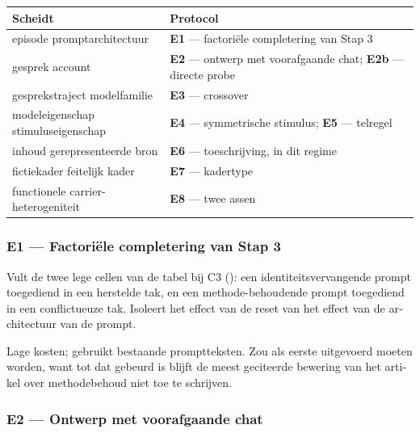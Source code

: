 \begin{dutch}
\begin{center}
\small
\begin{tabularx}{\linewidth}{>{\raggedright\arraybackslash}X>{\raggedright\arraybackslash}X}
\toprule
\textbf{Scheidt} & \textbf{Protocol} \\
\midrule
episode \gharr{} promptarchitectuur & \textbf{E1} — factoriële completering van Stap 3 \\
gesprek \gharr{} account & \textbf{E2} — ontwerp met voorafgaande chat; \textbf{E2b} — directe probe \\
gesprekstraject \gharr{} modelfamilie & \textbf{E3} — crossover \\
modeleigenschap \gharr{} stimuluseigenschap & \textbf{E4} — symmetrische stimulus; \textbf{E5} — telregel \\
inhoud \gharr{} gerepresenteerde bron & \textbf{E6} — toeschrijving, in dit regime \\
fictiekader \gharr{} feitelijk kader & \textbf{E7} — kadertype \\
functionele \gharr{} carrier-heterogeniteit & \textbf{E8} — twee assen \\
\bottomrule
\end{tabularx}
\end{center}

\subsubsection*{E1 — Factoriële completering van Stap 3}
\label{sec:nl:x-e1-factori-le-completering-van-stap-3}

Vult de twee lege cellen van de tabel bij C3 (): een identiteitsvervangende prompt toegediend in een herstelde tak, en een methode-behoudende prompt toegediend in een conflictueuze tak. Isoleert het effect van de reset van het effect van de architectuur van de prompt.

Lage kosten; gebruikt bestaande promptteksten. Zou als eerste uitgevoerd moeten worden, want tot dat gebeurd is blijft de meest geciteerde bewering van het artikel over methodebehoud niet toe te schrijven.


\subsubsection*{E2 — Ontwerp met voorafgaande chat}
\label{sec:nl:x-e2-ontwerp-met-voorafgaande-chat}


\end{dutch}
